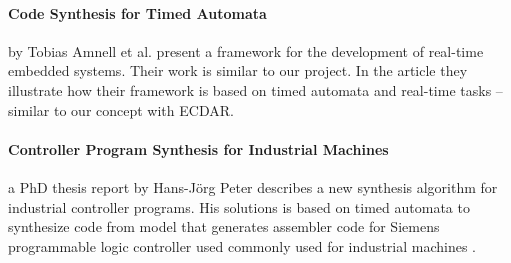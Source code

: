 \paragraph{Code Synthesis for Timed Automata}
by Tobias Amnell et al. present a framework for the development of real-time
embedded systems\cite{Amnell:2002:CST:779110.779112}. Their work is similar to
our project. In the article they illustrate how their framework is based on timed
automata and real-time tasks -- similar to our concept with ECDAR.

\paragraph{Controller Program Synthesis for Industrial Machines}
a PhD thesis report by Hans-Jörg Peter describes a new synthesis algorithm for
industrial controller programs. His solutions is based on timed automata to
synthesize code from model that generates assembler code for Siemens
programmable logic controller used commonly used for industrial
machines \cite{controller-program-synthesis:2005}.
